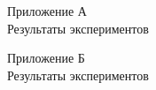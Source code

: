 \begin{center}
    Приложение А\\
    Результаты экспериментов
\end{center}
\newpage
\addtocounter{page}{2}
\begin{center}
    Приложение Б\\
    Результаты экспериментов
\end{center}